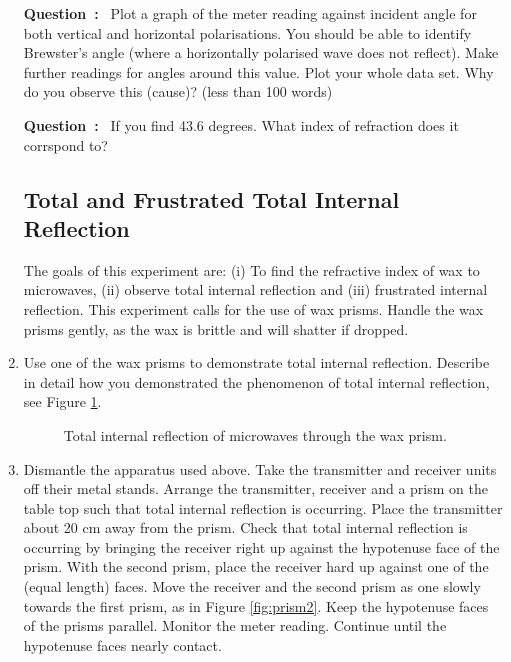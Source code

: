 \documentclass{article}
\newcounter{question}
\newcommand{\Question}{\textbf{Question~\thequestion:}~ \stepcounter{question}}
\begin{document}
\begin{enumerate}
\Question  Plot a graph of the meter reading against incident angle for both vertical and horizontal polarisations. You should be able to identify Brewster's angle (where a horizontally polarised wave does not reflect). Make further readings for angles around this value. Plot your whole data set. Why do you observe this (cause)? (less than 100 words)

\Question If you find 43.6 degrees. What index of refraction does it corrspond to? 

\subsection*{Total and Frustrated Total Internal Reflection}

The goals of this experiment are: (i) To find the refractive index of wax to microwaves, (ii) observe total internal reflection and (iii) frustrated internal reflection. This experiment calls for the use of wax prisms. Handle the wax prisms gently, as the wax is brittle and will shatter if dropped.

\item Use one of the wax prisms to demonstrate total internal reflection. Describe in detail how you demonstrated the phenomenon of total internal reflection, see Figure \ref{fig:prism1}.

\begin{figure}[!h]
\begin{centering}

\caption{\label{fig:prism1}Total internal reflection of microwaves through the wax prism.}
\end{centering}
\end{figure}

\item Dismantle the apparatus used above. Take the transmitter and receiver units off their metal stands. Arrange the transmitter, receiver and a prism on the table top such that total internal reflection is occurring. Place the transmitter about 20 cm away from the prism. Check that total internal reflection is occurring by bringing the receiver right up against the hypotenuse face of the prism. With the second prism, place the receiver hard up against one of the (equal length) faces. Move the receiver and the second prism as one slowly towards the first prism, as in Figure \ref{fig:prism2}. Keep the hypotenuse faces of the prisms parallel. Monitor the meter reading. Continue until the hypotenuse faces nearly contact. 


\end{enumerate}
\end{document}
